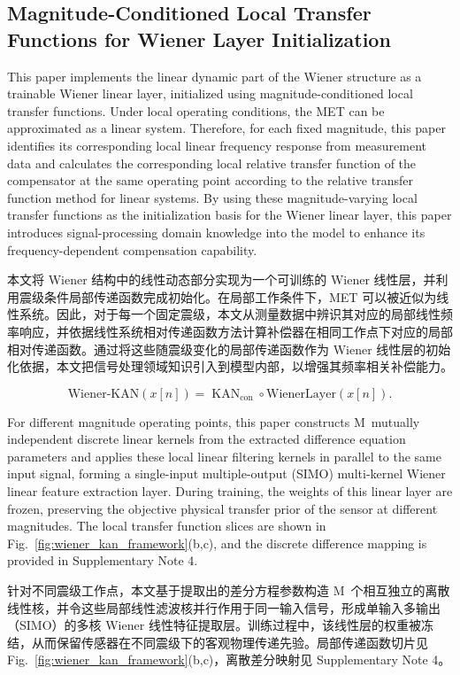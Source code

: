 \documentclass[sn-nature]{sn-jnl}
\newif\ifCNENEnglish
\newif\ifCNENBilingual
\newcommand{\CNEN}[2]{%
    \ifCNENBilingual
        #1%
        \if\relax\detokenize{#2}\relax\else\par #2\fi%
    \else
        \ifCNENEnglish
            #2%
        \else
            #1%
        \fi
    \fi
}
\newcommand{\mmax}{M} %
\begin{document}
\subsection{Magnitude-Conditioned Local Transfer Functions for Wiener Layer Initialization}

\CNEN{本文将 Wiener 结构中的线性动态部分实现为一个可训练的 Wiener 线性层，并利用震级条件局部传递函数完成初始化。在局部工作条件下，MET 可以被近似为线性系统。因此，对于每一个固定震级，本文从测量数据中辨识其对应的局部线性频率响应，并依据线性系统相对传递函数方法计算补偿器在相同工作点下对应的局部相对传递函数。通过将这些随震级变化的局部传递函数作为 Wiener 线性层的初始化依据，本文把信号处理领域知识引入到模型内部，以增强其频率相关补偿能力。}{This paper implements the linear dynamic part of the Wiener structure as a trainable Wiener linear layer, initialized using magnitude-conditioned local transfer functions. Under local operating conditions, the MET can be approximated as a linear system. Therefore, for each fixed magnitude, this paper identifies its corresponding local linear frequency response from measurement data and calculates the corresponding local relative transfer function of the compensator at the same operating point according to the relative transfer function method for linear systems. By using these magnitude-varying local transfer functions as the initialization basis for the Wiener linear layer, this paper introduces signal-processing domain knowledge into the model to enhance its frequency-dependent compensation capability.%
}

\begin{equation}
    \text{Wiener-KAN}(x[n]) = \operatorname{KAN}_{\text{con}} \circ \mathrm{WienerLayer}(x[n]).
    \label{eq:wiener_kan}
\end{equation}

\CNEN{针对不同震级工作点，本文基于提取出的差分方程参数构造 \mmax~个相互独立的离散线性核，并令这些局部线性滤波核并行作用于同一输入信号，形成单输入多输出（SIMO）的多核 Wiener 线性特征提取层。训练过程中，该线性层的权重被冻结，从而保留传感器在不同震级下的客观物理传递先验。局部传递函数切片见 Fig.~\ref{fig:wiener_kan_framework}(b,c)，离散差分映射见 Supplementary Note 4。}{For different magnitude operating points, this paper constructs \mmax~mutually independent discrete linear kernels from the extracted difference equation parameters and applies these local linear filtering kernels in parallel to the same input signal, forming a single-input multiple-output (SIMO) multi-kernel Wiener linear feature extraction layer. During training, the weights of this linear layer are frozen, preserving the objective physical transfer prior of the sensor at different magnitudes. The local transfer function slices are shown in Fig.~\ref{fig:wiener_kan_framework}(b,c), and the discrete difference mapping is provided in Supplementary Note 4.%
}
\end{document}
